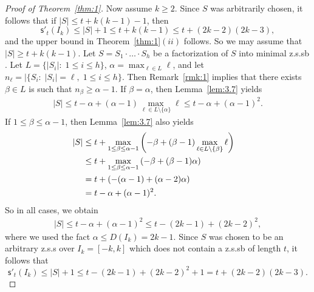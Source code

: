 \documentclass[12 pt]{amsart}
\def \zs{z.s.s }
\def \zsb{z.s.s{\tiny b} }
\def \m{\mathsf{s}'}
\begin{document}
\begin{proof}[Proof of Theorem~\ref{thm:1}]
Now assume $k\geq2$.  Since $S$ 
was arbitrarily chosen,  it follows that if $|S|\leq t+k(k-1)-1$, then 
\[\m_t(I_k)\leq |S|+1\leq t+k(k-1)\leq t+(2k-2)(2k-3),\]
and the upper bound in Theorem~\ref{thm:1}$(ii)$ follows.
So we may assume that $|S|\geq t+k(k-1)$. Let $S=S_1\cdot\ldots\cdot S_h$  
be a factorization of $S$ into minimal \zsb. Let $L=\{|S_i|:\; 1\leq i\leq h\}$, $\alpha=\max_{\ell\in L}\ell$, and let $n_\ell=|\{S_i:\; |S_i|=\ell,\; 1\leq i\leq h\}$.
Then Remark~\ref{rmk:1} implies that there exists $\beta\in L$ is such that $n_\beta\geq \alpha-1$. 
If  $\beta=\alpha$, then Lemma~\ref{lem:3.7} yields
\begin{align*}
|S|\leq t-\alpha+(\alpha-1)\max_{\ell\in L\setminus\{\alpha\}}\ell\leq t-\alpha+(\alpha-1)^2.
\end{align*}
If  $1\leq \beta\leq \alpha-1$, then Lemma~\ref{lem:3.7} also yields 
\begin{align*}
|S|
&\leq t+\max_{1\leq \beta\leq \alpha-1}\left(-\beta+(\beta-1)\max_{\ell\in L\setminus\{\beta\}}\ell\right)
\cr
&\leq t+\max_{1\leq \beta\leq \alpha-1}\left(-\beta+(\beta-1)\alpha\right)\cr
&= t+\left(-(\alpha-1)+(\alpha-2)\alpha\right)\cr
&= t-\alpha+(\alpha-1)^2.\cr
\end{align*}
So in all cases, we obtain
\begin{align}\label{eq:uba}
|S|\leq t-\alpha+(\alpha-1)^2\leq t-(2k-1)+(2k-2)^2,
\end{align}
where we used the fact $\alpha\leq D(I_k)=2k-1$.
Since $S$ was chosen to be an arbitrary \zs over $I_k=[-k,k]$ which does not contain a \zsb of length $t$, it follows that 
\[\m_t(I_k)\leq |S|+1\leq t-(2k-1)+(2k-2)^2+1=t+(2k-2)(2k-3).\]
\end{proof}
%
\end{document}
